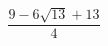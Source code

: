 \documentclass[preview]{standalone}
\begin{document}
\begin{align*}
\dfrac{9 - 6\sqrt{13} + 13 }{4}
\end{align*}
\end{document}
